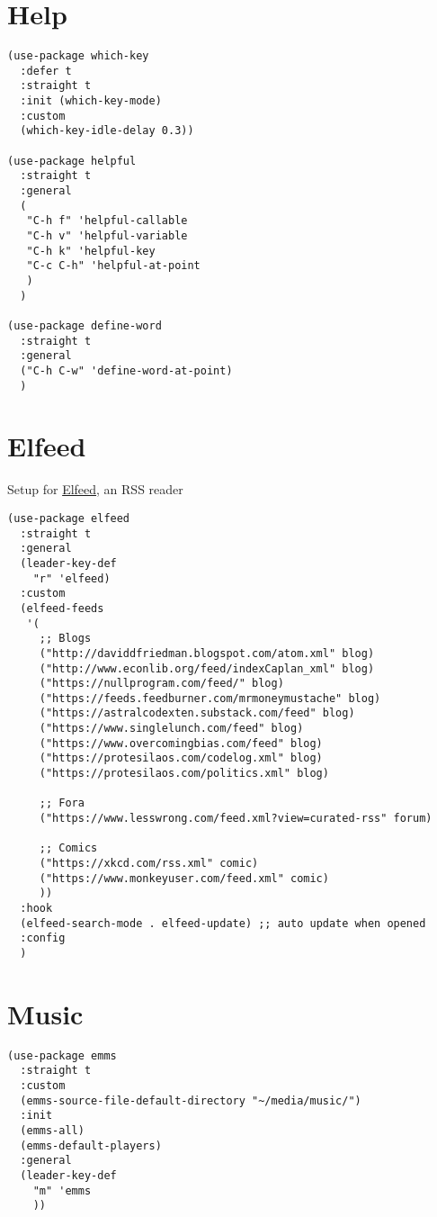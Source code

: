 \documentclass[11pt]{article}
\begin{document}
\section{Help}
\label{sec:org86a5ed3}
\begin{verbatim}
(use-package which-key
  :defer t
  :straight t
  :init (which-key-mode)
  :custom
  (which-key-idle-delay 0.3))

(use-package helpful
  :straight t
  :general
  (
   "C-h f" 'helpful-callable
   "C-h v" 'helpful-variable
   "C-h k" 'helpful-key
   "C-c C-h" 'helpful-at-point
   )
  )

(use-package define-word
  :straight t
  :general
  ("C-h C-w" 'define-word-at-point)
  )
\end{verbatim}

\section{Elfeed}
\label{sec:org5a3fb56}
Setup for \href{https://github.com/skeeto/elfeed}{Elfeed}, an RSS reader
\begin{verbatim}
(use-package elfeed
  :straight t
  :general
  (leader-key-def
    "r" 'elfeed)
  :custom 
  (elfeed-feeds
   '(
     ;; Blogs
     ("http://daviddfriedman.blogspot.com/atom.xml" blog)
     ("http://www.econlib.org/feed/indexCaplan_xml" blog)
     ("https://nullprogram.com/feed/" blog)
     ("https://feeds.feedburner.com/mrmoneymustache" blog)
     ("https://astralcodexten.substack.com/feed" blog)
     ("https://www.singlelunch.com/feed" blog)
     ("https://www.overcomingbias.com/feed" blog)
     ("https://protesilaos.com/codelog.xml" blog)
     ("https://protesilaos.com/politics.xml" blog)

     ;; Fora
     ("https://www.lesswrong.com/feed.xml?view=curated-rss" forum)

     ;; Comics
     ("https://xkcd.com/rss.xml" comic)
     ("https://www.monkeyuser.com/feed.xml" comic)
     ))
  :hook
  (elfeed-search-mode . elfeed-update) ;; auto update when opened
  :config
  )
\end{verbatim}

\section{Music}
\label{sec:orgef2247c}
\begin{verbatim}
(use-package emms
  :straight t
  :custom
  (emms-source-file-default-directory "~/media/music/")
  :init
  (emms-all)
  (emms-default-players)
  :general
  (leader-key-def
    "m" 'emms
    ))
\end{verbatim}
\end{document}
